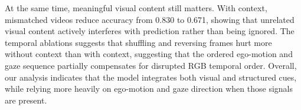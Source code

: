 \documentclass[letterpaper, 10pt, journal]{IEEEtran}  %
\begin{document}
At the same time, meaningful visual content still matters. With context, mismatched videos reduce accuracy from 0.830 to 0.671, showing that unrelated visual content actively interferes with prediction rather than being ignored. The temporal ablations suggests that shuffling and reversing frames hurt more without context than with context, suggesting that the ordered ego-motion and gaze sequence partially compensates for disrupted RGB temporal order. Overall, our analysis indicates that the model integrates both visual and structured cues, while relying more heavily on ego-motion and gaze direction when those signals are present.

\begin{table}[t]
\centering
\small 
\caption{Counterfactual input ablation results for the fine-tuned model on the test set. Frame-shuffling results are reported as mean $\pm$ standard deviation over three seeds. Accuracy changes are relative to the original-video condition.}
\label{tab:counterfactual_input_ablation}


\vspace{1em}


\end{table}
\end{document}
